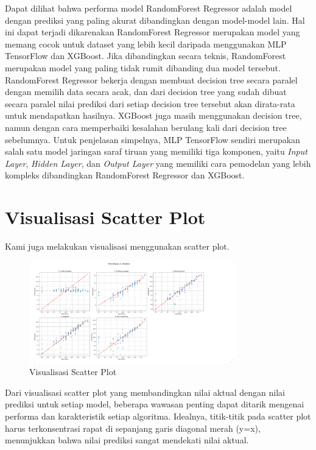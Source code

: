 Dapat dilihat bahwa performa model RandomForest Regressor adalah model dengan prediksi yang paling akurat dibandingkan dengan model-model lain. 
Hal ini dapat terjadi dikarenakan RandomForest Regressor merupakan model yang memang cocok untuk dataset yang lebih kecil daripada menggunakan MLP TensorFlow 
dan XGBoost. Jika dibandingkan secara teknis, RandomForest merupakan model yang paling tidak rumit dibanding dua model tersebut. RandomForest 
Regressor bekerja dengan membuat decision tree secara paralel dengan memilih data secara acak, dan dari decision tree yang sudah dibuat secara 
paralel nilai prediksi dari setiap decision tree tersebut akan dirata-rata untuk mendapatkan hasilnya. XGBoost juga masih menggunakan decision 
tree, namun dengan cara memperbaiki kesalahan berulang kali dari decision tree sebelumnya. Untuk penjelasan simpelnya, MLP TensorFlow sendiri 
merupakan salah satu model jaringan saraf tiruan yang memiliki tiga komponen, yaitu \textit{Input Layer}, \textit{Hidden Layer}, 
dan \textit{Output Layer} yang memiliki cara pemodelan yang lebih kompleks dibandingkan RandomForest Regressor dan XGBoost.

\section{Visualisasi Scatter Plot}

Kami juga melakukan visualisasi menggunakan scatter plot.

\begin{figure}[h]
    \centering
    \includegraphics[width=0.8\textwidth]{images/scatter_plot.png}
    \caption{Visualisasi Scatter Plot}
    \label{fig:scatter}
\end{figure}

Dari visualisasi scatter plot yang membandingkan nilai aktual dengan nilai prediksi untuk setiap model, beberapa wawasan penting dapat ditarik 
mengenai performa dan karakteristik setiap algoritma. Idealnya, titik-titik pada scatter plot harus terkonsentrasi rapat di sepanjang garis 
diagonal merah (y=x), menunjukkan bahwa nilai prediksi sangat mendekati nilai aktual.\\

